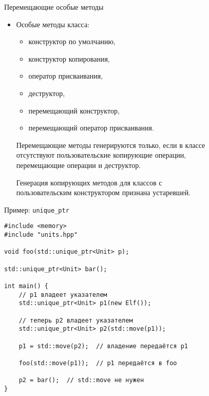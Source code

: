 \documentclass[aspectration=1610,t]{beamer}
\begin{document}
\begin{frame}[fragile]{Перемещающие особые методы}
    \begin{itemize}
        \item Особые методы класса:
            \begin{itemize}
                \item конструктор по умолчанию,
                \item конструктор копирования,
                \item оператор присваивания,
                \item деструктор,
                \item перемещающий конструктор,
                \item перемещающий оператор присваивания.
             \end{itemize}
                
        \pitem Перемещающие методы генерируются только, если в классе\\ отсутствуют пользовательские копирующие операции,\\ перемещающие операции и деструктор.

        \pitem Генерация копирующих методов для классов с \\ пользовательским конструктором признана устаревшей.
    \end{itemize}
\end{frame}

\begin{frame}[fragile]{Пример: {\tt unique\_ptr}}
    \begin{lstlisting}
#include <memory>
#include "units.hpp"

void foo(std::unique_ptr<Unit> p);

std::unique_ptr<Unit> bar();

int main() {
    // p1 владеет указателем
    std::unique_ptr<Unit> p1(new Elf());  

    // теперь p2 владеет указателем
    std::unique_ptr<Unit> p2(std::move(p1));
    
    p1 = std::move(p2);  // владение передаётся p1
    
    foo(std::move(p1));  // p1 передаётся в foo
    
    p2 = bar();  // std::move не нужен  
} 
    \end{lstlisting}
\end{frame}
\end{document}
